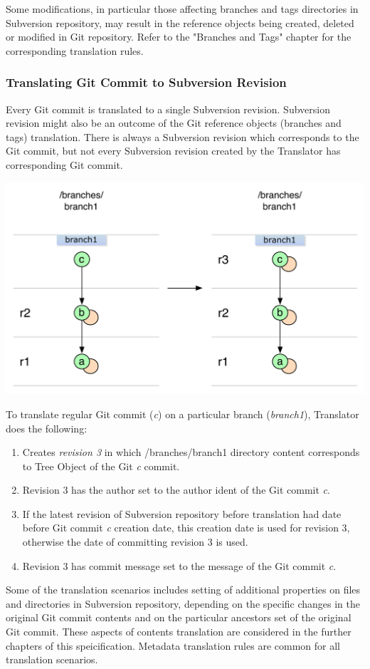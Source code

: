 Some modifications, in particular those affecting branches and tags directories in Subversion repository, may
result in the reference objects being created, deleted or modified in Git repository. Refer to the "Branches and Tags" 
chapter for the corresponding translation rules.

\subsubsection{Translating Git Commit to Subversion Revision}
Every Git commit is translated to a single Subversion revision. Subversion revision might also be an outcome of 
the Git reference objects (branches and tags) translation. There is always a Subversion revision
which corresponds to the Git commit, but not every Subversion revision created by the Translator has 
corresponding Git commit.
\begin{center}
\includegraphics[width=\textwidth]{img/diagrams/single_change_git_to_svn.pdf}%
\label{single_change_git_to_svn}%
\end{center}

To translate regular Git commit (\emph{c}) on a particular branch (\emph{branch1}), Translator does 
the following:
\begin{enumerate}
	\compactlist
	\item Creates \emph{revision 3} in which /branches/branch1 directory content corresponds to Tree Object of the Git \emph{c} commit.
	\item Revision 3 has the author set to the author ident of the Git commit \emph{c}.
	\item If the latest revision of Subversion repository before translation had date before Git commit \emph{c} creation date, this creation date is used for revision 3, otherwise the date of committing revision 3 is used.
	\item Revision 3 has commit message set to the message of the Git commit \emph{c}.
\end{enumerate}

Some of the translation scenarios includes setting of additional properties on files and directories 
in Subversion repository, depending on the specific changes in the original Git commit contents and 
on the particular ancestors set of the original Git commit. These aspects of contents translation are considered in the further chapters of
this speicification. Metadata translation rules are common for all translation scenarios.